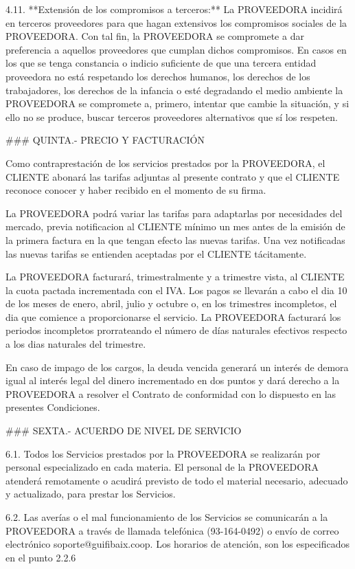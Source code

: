 4.11. **Extensión de los compromisos a terceros:**
	La PROVEEDORA incidirá en terceros proveedores
	para que hagan extensivos los compromisos sociales de la PROVEEDORA.
	Con tal fin, la PROVEEDORA se compromete a dar preferencia a aquellos proveedores 
	que cumplan dichos compromisos.
	En casos en los que se tenga constancia o indicio suficiente
	de que una tercera entidad proveedora no está respetando
	los derechos humanos,
	los derechos de los trabajadores,
	los derechos de la infancia
	o esté degradando el medio ambiente
	la PROVEEDORA se compromete a, primero, intentar que cambie la situación,
	y si ello no se produce, buscar terceros proveedores alternativos que sí los respeten.


### QUINTA.- PRECIO Y FACTURACIÓN

Como contraprestación de los servicios prestados por la PROVEEDORA, el CLIENTE abonará
las tarifas adjuntas al presente contrato y que el CLIENTE reconoce conocer y haber recibido
en el momento de su firma.

La PROVEEDORA podrá variar las tarifas para adaptarlas por necesidades del mercado,
previa notificacion al CLIENTE mínimo un mes antes de la emisión de la primera factura
en la que tengan efecto las nuevas tarifas.
Una vez notificadas las nuevas tarifas se entienden aceptadas por el CLIENTE tácitamente.

La PROVEEDORA facturará, trimestralmente y a trimestre vista,
al CLIENTE la cuota pactada incrementada con el IVA.
Los pagos se llevarán a cabo el dia 10
de los meses de enero, abril, julio y octubre
o, en los trimestres incompletos, el dia que comience a proporcionarse el servicio.
La PROVEEDORA facturará los periodos incompletos prorrateando
el número de días naturales efectivos respecto a los dias naturales del trimestre.

En caso de impago de los cargos,
la deuda vencida generará un interés de demora igual al interés legal del dinero
incrementado en dos puntos y dará derecho a la PROVEEDORA a resolver el
Contrato de conformidad con lo dispuesto en las presentes Condiciones.


### SEXTA.- ACUERDO DE NIVEL DE SERVICIO

6.1.
	Todos los Servicios prestados por la PROVEEDORA se realizarán por personal especializado en cada materia.
	El personal de la PROVEEDORA atenderá remotamente o acudirá previsto de todo el material necesario, 
	adecuado y actualizado, para prestar los Servicios.

6.2.
	Las averías o el mal funcionamiento de los Servicios se comunicarán a la PROVEEDORA
	a través de llamada telefónica (93-164-0492) o
	envío de correo electrónico soporte@guifibaix.coop.
	Los horarios de atención, son los especificados en el punto 2.2.6

